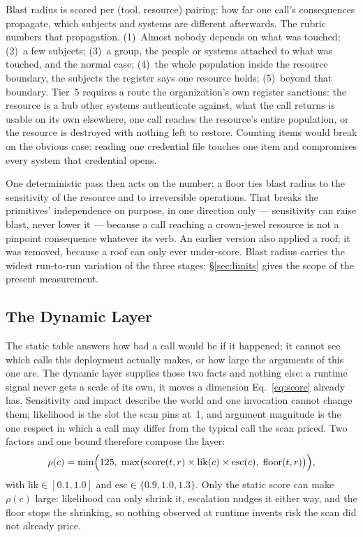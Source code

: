 \documentclass[sigconf]{acmart}
\begin{document}
Blast radius is scored per (tool, resource) pairing: how far one call's
consequences propagate, which subjects and systems are different afterwards.
The rubric numbers that propagation. (1)~Almost nobody depends on what was
touched; (2)~a few subjects; (3)~a group, the people or systems
attached to what was touched, and the normal case; (4)~the whole population
inside the resource boundary, the subjects the register says one resource
holds; (5)~beyond that boundary. Tier~5 requires a route the organization's own
register sanctions: the resource is a hub other systems
authenticate against, what the call returns is usable on its own elsewhere, one
call reaches the resource's entire population, or the resource is destroyed
with nothing left to restore. Counting items would break on the obvious case:
reading one credential file touches one item and compromises every system that
credential opens.

One deterministic pass then acts on the number: a floor ties blast radius to
the sensitivity of the resource and to irreversible operations. That breaks the
primitives' independence on purpose, in one direction only --- sensitivity can
raise blast, never lower it --- because a call reaching a crown-jewel resource
is not a pinpoint consequence whatever its verb. An earlier version also
applied a roof; it was removed, because a roof can only
ever under-score. Blast radius carries the widest run-to-run variation of the
three stages; \S\ref{sec:limits} gives the scope of the present measurement.

\subsection{The Dynamic Layer}
\label{sec:dynamic}

The static table answers how bad a call would be if it happened; it cannot see
which calls this deployment actually makes, or how large the arguments of this
one are. The dynamic layer supplies those two facts and nothing else: a runtime
signal never gets a scale of its own, it moves a dimension Eq.~\ref{eq:score}
already has. Sensitivity and impact describe the world and one invocation
cannot change them; likelihood is the slot the scan pins at~1, and argument
magnitude is the one respect in which a call may differ from the typical call
the scan priced. Two factors and one bound therefore compose the layer:
\begin{equation}
\rho(c) = \min\Bigl(125,\; \max\bigl(\mathrm{score}(t,r) \times
          \mathrm{lik}(c) \times \mathrm{esc}(c),\;
          \mathrm{floor}(t,r)\bigr)\Bigr),
\label{eq:rho}
\end{equation}
with $\mathrm{lik} \in [0.1, 1.0]$ and $\mathrm{esc} \in \{0.9, 1.0, 1.3\}$.
Only the static score can make $\rho(c)$ large: likelihood can only shrink it,
escalation nudges it either way, and the floor stops the shrinking, so nothing
observed at runtime invents risk the scan did not already price.
\end{document}
